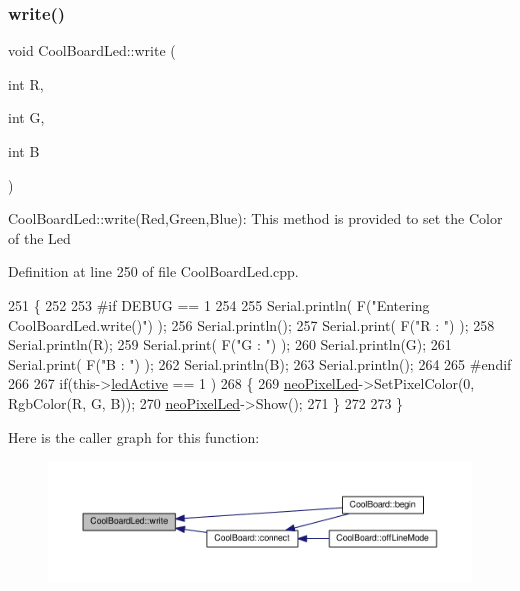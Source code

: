 \subsubsection{\texorpdfstring{write()}{write()}}
{\footnotesize\ttfamily void Cool\+Board\+Led\+::write (\begin{DoxyParamCaption}\item[{int}]{R,  }\item[{int}]{G,  }\item[{int}]{B }\end{DoxyParamCaption})}

Cool\+Board\+Led\+::write(\+Red,\+Green,\+Blue)\+: This method is provided to set the Color of the Led 

Definition at line 250 of file Cool\+Board\+Led.\+cpp.


\begin{DoxyCode}
251 \{
252 
253 \textcolor{preprocessor}{#if DEBUG == 1}
254 
255     Serial.println( F(\textcolor{stringliteral}{"Entering CoolBoardLed.write()"}) );
256     Serial.println();
257     Serial.print( F(\textcolor{stringliteral}{"R : "}) );
258     Serial.println(R);
259     Serial.print( F(\textcolor{stringliteral}{"G : "}) );
260     Serial.println(G);
261     Serial.print( F(\textcolor{stringliteral}{"B : "}) );
262     Serial.println(B);
263     Serial.println();   
264 
265 \textcolor{preprocessor}{#endif}
266 
267     \textcolor{keywordflow}{if}(this->\hyperlink{class_cool_board_led_a5f17c135516fcf4b44ea8a096ba0177a}{ledActive} == 1 )
268     \{
269         \hyperlink{class_cool_board_led_ac2c13fa462a010cd9242bf297c013923}{neoPixelLed}->SetPixelColor(0, RgbColor(R, G, B));
270         \hyperlink{class_cool_board_led_ac2c13fa462a010cd9242bf297c013923}{neoPixelLed}->Show();
271     \}
272 
273 \}
\end{DoxyCode}
Here is the caller graph for this function\+:\nopagebreak
\begin{figure}[H]
\begin{center}
\leavevmode
\includegraphics[width=350pt]{de/dc0/class_cool_board_led_a30fadd4cbec17ceea428bf7a32207e87_icgraph}
\end{center}
\end{figure}


